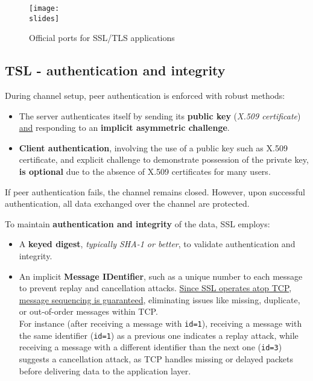 \begin{figure}[h]
    \centering
    \texttt{[image: \\slides]}
    \caption{Official ports for SSL/TLS applications}
\end{figure}


\subsection{TSL - authentication and integrity}
During channel setup, peer authentication is enforced with robust methods:

\begin{itemize}
    \item The server authenticates itself by sending its \textbf{public key} (\textit{X.509 certificate}) \underline{and} responding to an \textbf{implicit asymmetric challenge}.
    \item \textbf{Client authentication}, involving the use of a public key such as X.509 certificate, and explicit challenge to demonstrate possession of the private key, \textbf{is optional} due to the absence of X.509 certificates for many users.
\end{itemize}
If peer authentication fails, the channel remains closed. However, upon successful authentication, all data exchanged over the channel are protected.

To maintain \textbf{authentication and integrity} of the data, SSL employs:
\begin{itemize}
    \item A \textbf{keyed digest}, \textit{typically SHA-1 or better}, to validate authentication and integrity.
    \item An implicit \textbf{Message IDentifier}, such as a unique number to each message to prevent replay and cancellation attacks. \ul{Since SSL operates atop TCP}, \ul{message sequencing is guaranteed}, eliminating issues like missing, duplicate, or out-of-order messages within TCP.\\
          For instance (after receiving a message with \texttt{id=1}), receiving a message with the same identifier (\texttt{id=1}) as a previous one indicates a replay attack, while receiving a message with a different identifier than the next one (\texttt{id=3}) suggests a cancellation attack, as TCP handles missing or delayed packets before delivering data to the application layer.
\end{itemize}



